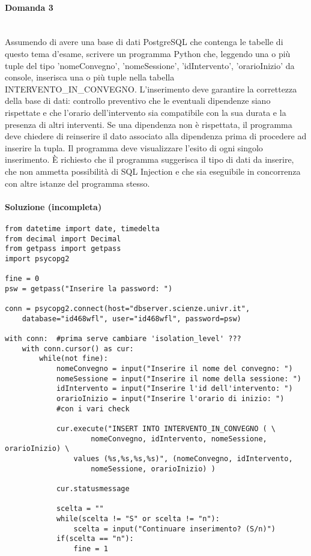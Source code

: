 \documentclass[a4paper, 10pt, titlepage]{article}
\begin{document}
\paragraph{Domanda 3}\dotfill
\\Assumendo di avere una base di dati PostgreSQL che contenga le tabelle di questo tema d'esame, scrivere un programma Python che, leggendo una o più tuple del tipo 'nomeConvegno', 'nomeSessione', 'idIntervento', 'orarioInizio' da console, inserisca una o più tuple nella tabella INTERVENTO\_IN\_CONVEGNO. L'inserimento deve garantire la correttezza della base di dati: controllo preventivo che le eventuali dipendenze siano rispettate e che l'orario dell'intervento sia compatibile con la sua durata e la presenza di altri interventi. Se una dipendenza non è rispettata, il programma deve chiedere di reinserire il dato associato alla dipendenza prima di procedere ad inserire la tupla. Il programma deve visualizzare l'esito di ogni singolo inserimento. È richiesto che il programma suggerisca il tipo di dati da inserire, che non ammetta possibilità di SQL Injection e che sia eseguibile in concorrenza con altre istanze del programma stesso.

\paragraph{Soluzione (incompleta)}\dotfill
\lstset{language=Python}
\begin{lstlisting}[tabsize=2]
from datetime import date, timedelta
from decimal import Decimal
from getpass import getpass
import psycopg2

fine = 0
psw = getpass("Inserire la password: ")
    
conn = psycopg2.connect(host="dbserver.scienze.univr.it",
	database="id468wfl", user="id468wfl", password=psw)
	
with conn:	#prima serve cambiare 'isolation_level' ???
	with conn.cursor() as cur:
		while(not fine):
			nomeConvegno = input("Inserire il nome del convegno: ")
			nomeSessione = input("Inserire il nome della sessione: ")
			idIntervento = input("Inserire l'id dell'intervento: ")
			orarioInizio = input("Inserire l'orario di inizio: ")
			#con i vari check
			
			cur.execute("INSERT INTO INTERVENTO_IN_CONVEGNO ( \ 	
					nomeConvegno, idIntervento, nomeSessione, orarioInizio) \
				values (%s,%s,%s,%s)", (nomeConvegno, idIntervento, 
					nomeSessione, orarioInizio) )
			
			cur.statusmessage
			
			scelta = ""
			while(scelta != "S" or scelta != "n"):
				scelta = input("Continuare inserimento? (S/n)")
			if(scelta == "n"):
				fine = 1
				

\end{lstlisting}
\end{document}
